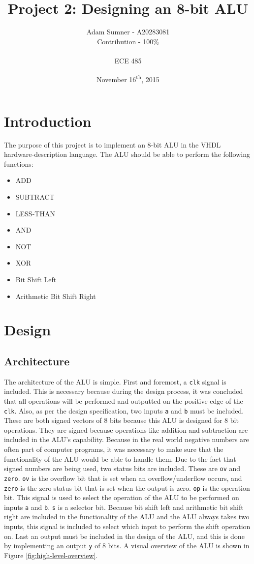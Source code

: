 \documentclass[12pt]{article}
\title{Project 2: Designing an 8-bit ALU}
\author{Adam Sumner - A20283081 \\ Contribution - 100\% \\ ~\\ ECE 485}
\date{November 16\textsuperscript{th}, 2015}
\begin{document}
\maketitle

\section{Introduction}
The purpose of this project is to implement an 8-bit ALU in the VHDL hardware-description language. The ALU should be able to perform the following functions:
\begin{itemize}
	\item ADD
	\item SUBTRACT
	\item LESS-THAN
	\item AND
	\item NOT
	\item XOR
	\item Bit Shift Left
	\item Arithmetic Bit Shift Right
\end{itemize}
\section{Design}
\subsection{Architecture}
The architecture of the ALU is simple. First and foremost, a \texttt{clk} signal is included. This is necessary because during the design process, it was concluded that all operations will be performed and outputted on the positive edge of the \texttt{clk}. Also, as per the design specification, two inputs \texttt{a} and \texttt{b} must be included. These are both signed vectors of 8 bits because this ALU is designed for 8 bit operations. They are signed because operations like addition and subtraction are included in the ALU's capability. Because in the real world negative numbers are often part of computer programs, it was necessary to make sure that the functionality of the ALU would be able to handle them. Due to the fact that signed numbers are being used, two status bits are included. These are \texttt{ov} and \texttt{zero}. \texttt{ov} is the overflow bit that is set when an overflow/underflow occurs, and \texttt{zero} is the zero status bit that is set when the output is zero. \texttt{op} is the operation bit. This signal is used to select the operation of the ALU to be performed on inputs \texttt{a} and \texttt{b}. \texttt{s} is a selector bit. Because bit shift left and arithmetic bit shift right are included in the functionality of the ALU and the ALU always takes two inputs, this signal is included to select which input to perform the shift operation on. Last an output must be included in the design of the ALU, and this is done by implementing an output \texttt{y} of 8 bits. A visual overview of the ALU is shown in Figure \ref{fig:high-level-overview}.
\end{document}
